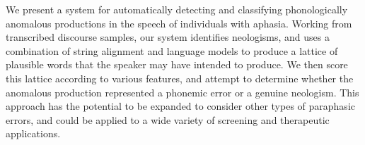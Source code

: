 We present a system for automatically detecting and classifying phonologically anomalous productions in the speech of individuals with aphasia. Working from transcribed discourse samples, our system identifies neologisms, and uses a combination of string alignment and language models to produce a lattice of plausible words that the speaker may have intended to produce. We then score this lattice according to various features, and attempt to determine whether the anomalous production represented a phonemic error or a genuine neologism. This approach has the potential to be expanded to consider other types of paraphasic errors, and could be applied to a wide variety of screening and therapeutic applications.
